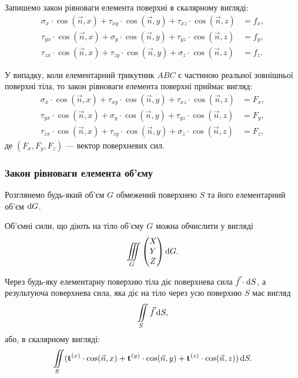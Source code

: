 Запишемо закон рівноваги елемента поверхні в скалярному вигляді:
\begin{align}
	\sigma_x \cdot \cos ( \vec n, x ) + \tau_{xy} \cdot \cos ( \vec n, y ) + \tau_{xz} \cdot \cos ( \vec n, z ) &= f_x, \\
	\tau_{yx} \cdot \cos ( \vec n, x ) + \sigma_y \cdot \cos ( \vec n, y ) + \tau_{yz} \cdot \cos ( \vec n, z ) &= f_y, \\
	\tau_{zx} \cdot \cos ( \vec n, x ) + \tau_{zy} \cdot \cos ( \vec n, y ) + \sigma_z \cdot \cos ( \vec n, z ) &= f_z.
\end{align}

У випадку, коли елементарний трикутник $ABC$ є частиною реальної зовнішньої поверхні тіла, то закон рівноваги елемента поверхні приймає вигляд:
\begin{align}
	\sigma_x \cdot \cos ( \vec n, x ) + \tau_{xy} \cdot \cos ( \vec n, y ) + \tau_{xz} \cdot \cos ( \vec n, z ) &= F_x, \\
	\tau_{yx} \cdot \cos ( \vec n, x ) + \sigma_y \cdot \cos ( \vec n, y ) + \tau_{yz} \cdot \cos ( \vec n, z ) &= F_y, \\
	\tau_{zx} \cdot \cos ( \vec n, x ) + \tau_{zy} \cdot \cos ( \vec n, y ) + \sigma_z \cdot \cos ( \vec n, z ) &= F_z,
\end{align}
де $(F_x, F_y, F_z)$ --- вектор поверхневих сил. \medskip

\subsubsection{Закон рівноваги елемента об'єму}

Розглянемо будь-який об'єм $G$ обмежений поверхнею $S$ та його елементарний об'єм $\mathop{}\!\mathrm{d} G$. \medskip

Об'ємні сили, що діють на тіло об'єму $G$ можна обчислити у вигляді
\begin{equation}
	\displaystyle\iiint\limits_G \begin{pmatrix} X \\ Y \\ Z \end{pmatrix} \mathop{}\!\mathrm{d} G.
\end{equation}

Через будь-яку елементарну поверхню тіла діє поверхнева сила $\vec f \cdot \mathop{}\!\mathrm{d} S$, а результуюча поверхнева сила, яка діє на тіло через усю поверхню $S$ має вигляд 
\begin{equation}
	\displaystyle\iint\limits_S \vec f \mathop{}\!\mathrm{d} S,
\end{equation}
або, в скалярному вигляді:
\begin{equation}
	\displaystyle\iint\limits_S ( \textbf{t}^{(x)} \cdot \cos ( \vec n, x ) + \textbf{t}^{(y)} \cdot \cos(\vec n, y) + \textbf{t}^{(z)} \cdot \cos (\vec n, z) ) \mathop{}\!\mathrm{d} S.
\end{equation}


